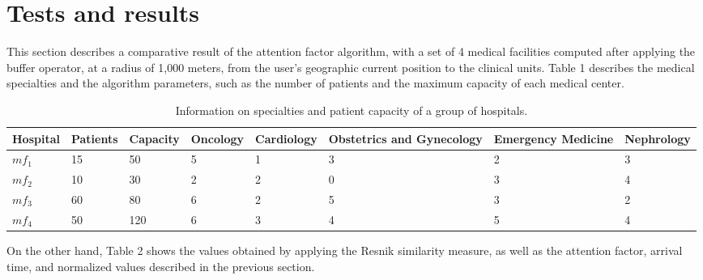 \documentclass[sustainability,article,submit,pdftex,moreauthors]{Definitions/mdpi}
\begin{document}
\section{Tests and results}


This section describes a comparative result of the attention factor algorithm, with a set of 4 medical facilities computed after applying the buffer operator, at a radius of 1,000 meters, from the user's geographic current position to the clinical units. Table 1 describes the medical specialties and the algorithm parameters, such as the number of patients and the maximum capacity of each medical center.

\begin{table}[H] 
\caption{Information on specialties and patient capacity of a group of hospitals.\label{table_hospital_info}}
\begin{tabularx}{\textwidth}{CCCCCCCC}
\toprule
\textbf{Hospital} & \textbf{Patients} & \textbf{Capacity} & \textbf{Oncology} & \textbf{Cardiology} & \textbf{Obstetrics and Gynecology} & \textbf{Emergency Medicine} & \textbf{Nephrology} \\
\midrule
$mf_{1}$ & 15 & 50  & 5 & 1 & 3 & 2 & 3 \\
$mf_{2}$ & 10 & 30  & 2 & 2 & 0 & 3 & 4 \\
$mf_{3}$ & 60 & 80  & 6 & 2 & 5 & 3 & 2 \\
$mf_{4}$ & 50 & 120 & 6 & 3 & 4 & 5 & 4 \\ 
\bottomrule
\end{tabularx}
\end{table}
\unskip

On the other hand, Table 2 shows the values obtained by applying the Resnik similarity measure, as well as the attention factor, arrival time, and normalized values described in the previous section.

\end{document}
